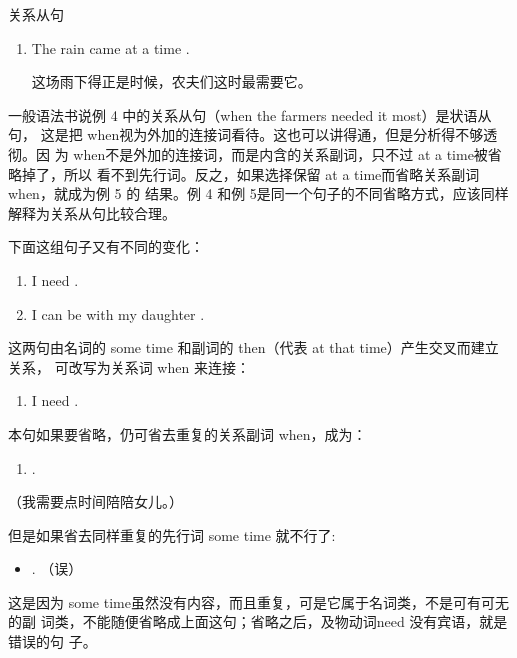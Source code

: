 关系从句
\begin{enumerate}[resume]
\item The rain came at a time .

  这场雨下得正是时候，农夫们这时最需要它。
\end{enumerate}

一般语法书说例 4 中的关系从句（when the farmers needed it most）是状语从句，
这是把 when视为外加的连接词看待。这也可以讲得通，但是分析得不够透彻。因
为 when不是外加的连接词，而是内含的关系副词，只不过 at a time被省略掉了，所以
看不到先行词。反之，如果选择保留 at a time而省略关系副词 when，就成为例 5 的
结果。例 4 和例 5是同一个句子的不同省略方式，应该同样解释为关系从句比较合理。

下面这组句子又有不同的变化：
\begin{enumerate}
\item I need .
\item I can be with my daughter .
\end{enumerate}
这两句由名词的 some time 和副词的 then（代表 at that time）产生交叉而建立关系，
可改写为关系词 when 来连接：
\begin{enumerate}[resume]
\item I need  .
\end{enumerate}
本句如果要省略，仍可省去重复的关系副词 when，成为：
\begin{enumerate}[resume]
\item {}   .
\end{enumerate}
（我需要点时间陪陪女儿。）

但是如果省去同样重复的先行词 some time 就不行了:
\begin{itemize}
\item {}  . （误）
\end{itemize}
这是因为 some time虽然没有内容，而且重复，可是它属于名词类，不是可有可无的副
词类，不能随便省略成上面这句；省略之后，及物动词need 没有宾语，就是错误的句
子。

